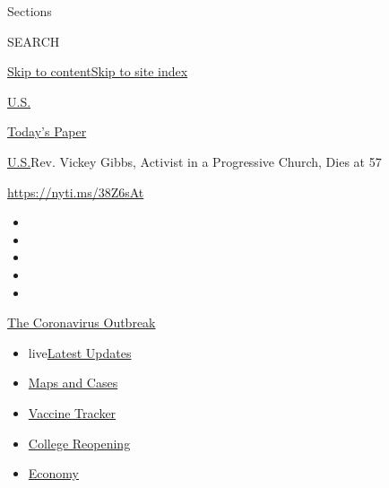 Sections

SEARCH

\protect\hyperlink{site-content}{Skip to
content}\protect\hyperlink{site-index}{Skip to site index}

\href{https://www.nytimes.com/section/us}{U.S.}

\href{https://myaccount.nytimes.com/auth/login?response_type=cookie\&client_id=vi}{}

\href{https://www.nytimes.com/section/todayspaper}{Today's Paper}

\href{/section/us}{U.S.}\textbar{}Rev. Vickey Gibbs, Activist in a
Progressive Church, Dies at 57

\url{https://nyti.ms/38Z6sAt}

\begin{itemize}
\item
\item
\item
\item
\item
\end{itemize}

\href{https://www.nytimes.com/news-event/coronavirus?action=click\&pgtype=Article\&state=default\&region=TOP_BANNER\&context=storylines_menu}{The
Coronavirus Outbreak}

\begin{itemize}
\tightlist
\item
  live\href{https://www.nytimes.com/2020/08/03/world/coronavirus-covid-19.html?action=click\&pgtype=Article\&state=default\&region=TOP_BANNER\&context=storylines_menu}{Latest
  Updates}
\item
  \href{https://www.nytimes.com/interactive/2020/us/coronavirus-us-cases.html?action=click\&pgtype=Article\&state=default\&region=TOP_BANNER\&context=storylines_menu}{Maps
  and Cases}
\item
  \href{https://www.nytimes.com/interactive/2020/science/coronavirus-vaccine-tracker.html?action=click\&pgtype=Article\&state=default\&region=TOP_BANNER\&context=storylines_menu}{Vaccine
  Tracker}
\item
  \href{https://www.nytimes.com/2020/08/02/us/covid-college-reopening.html?action=click\&pgtype=Article\&state=default\&region=TOP_BANNER\&context=storylines_menu}{College
  Reopening}
\item
  \href{https://www.nytimes.com/live/2020/08/03/business/stock-market-today-coronavirus?action=click\&pgtype=Article\&state=default\&region=TOP_BANNER\&context=storylines_menu}{Economy}
\end{itemize}


